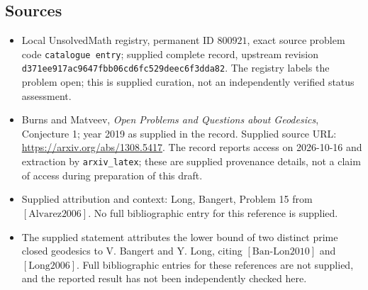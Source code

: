 \documentclass[11pt]{article}
\begin{document}
\subsection{Sources}
\begin{itemize}
\item Local UnsolvedMath registry, permanent ID \(800921\), exact source problem code \texttt{catalogue entry}; supplied complete record, upstream revision \texttt{d371ee917ac9647fbb06cd6fc529deec6f3dda82}. The registry labels the problem open; this is supplied curation, not an independently verified status assessment.
\item Burns and Matveev, \emph{Open Problems and Questions about Geodesics}, Conjecture 1; year 2019 as supplied in the record. Supplied source URL: \url{https://arxiv.org/abs/1308.5417}. The record reports access on 2026-10-16 and extraction by \texttt{arxiv\_latex}; these are supplied provenance details, not a claim of access during preparation of this draft.
\item Supplied attribution and context: Long, Bangert, Problem 15 from \([\mathrm{Alvarez2006}]\). No full bibliographic entry for this reference is supplied.
\item The supplied statement attributes the lower bound of two distinct prime closed geodesics to V. Bangert and Y. Long, citing \([\mathrm{Ban\text{-}Lon2010}]\) and \([\mathrm{Long2006}]\). Full bibliographic entries for these references are not supplied, and the reported result has not been independently checked here.
\end{itemize}
\end{document}
